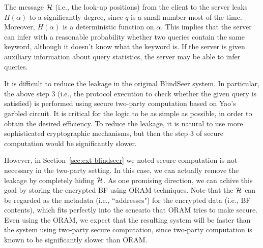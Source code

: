 The message ${\cal H}$ (i.e., the look-up positions) from the client to the server
leaks $H(\alpha)$ to a significantly degree, since $q$ is a small number most
of the time. Moreover, $H(\alpha)$ is a deterministic function on $\alpha$.
This implies that the server can infer with a reasonable probability whether
two queries contain the same keyword, although it doesn't know what the keyword
is.  If the server is given  auxiliary information about query statistics, the
server may be able to infer queries. 


It is difficult to reduce the leakage in the original
BlindSeer system. In particular, the above step 3 (i.e., the protocol execution
to check whether the given query is satisfied) is performed using secure
two-party computation based on Yao's garbled circuit. It is critical
for the logic to be as simple as possible, in order to obtain the desired
efficiency. To reduce the leakage, it is natural to use more sophisticated
cryptographic mechanisms, but then the step 3 of secure computation would be
significantly slower. 

However, in Section~\ref{sec:ext-blindseer} we noted secure computation is not
necessary in the two-party setting. In this case, we can actually remove the
leakage by completely hiding ${\cal H}$. As one promising direction, we can achive
this goal by storing the encrypted BF using ORAM techniques. Note that the
${\cal H}$ can be regarded as the metadata (i.e., ``addresses") for the encrypted
data (i.e., BF contents), which fits perfectly into the scneario that ORAM
tries to make secure. 
%
Even using the ORAM, we expect that the resulting system will be faster than
the system using two-party secure computation, since two-party computation is
known to be significantly slower than ORAM. 
